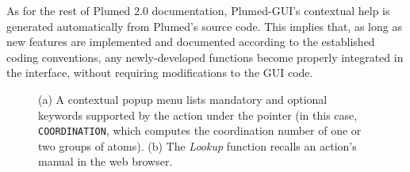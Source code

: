 \documentclass[preprint,review,11pt]{elsarticle}
\begin{document}
As for the rest of Plumed 2.0 documentation, Plumed-GUI's contextual
help is generated automatically from Plumed's source code.  This
implies that, as long as new features are implemented and documented
according to the established coding conventions, any newly-developed
functions become properly integrated in the interface, without
requiring modifications to the GUI code.






\begin{figure}
  \centering
  \caption{(a) A contextual popup menu lists mandatory and
    optional keywords supported by the action under the pointer (in
    this case, \texttt{COORDINATION}, which computes the coordination
    number of one or two groups of atoms). (b) The \emph{Lookup} function
    recalls an action's manual in the web browser. }
  \label{fig:help}
\end{figure}
\end{document}
